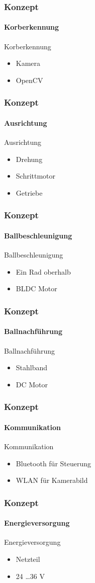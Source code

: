 \begin{frame}
    \frametitle{Konzept}
    \framesubtitle{Korberkennung}
    \begin{block}{Korberkennung}
        \begin{itemize}
            \item Kamera
            \item OpenCV
        \end{itemize}
    \end{block}
\end{frame}

\begin{frame}
    \frametitle{Konzept}
    \framesubtitle{Ausrichtung}
    \begin{block}{Ausrichtung}
        \begin{itemize}
            \item Drehung
            \item Schrittmotor
            \item Getriebe
        \end{itemize}
    \end{block}
\end{frame}

\begin{frame}
    \frametitle{Konzept}
    \framesubtitle{Ballbeschleunigung}
    \begin{block}{Ballbeschleunigung}
        \begin{itemize}
            \item Ein Rad oberhalb
            \item BLDC Motor
        \end{itemize}
    \end{block}
\end{frame}

\begin{frame}
    \frametitle{Konzept}
    \framesubtitle{Ballnachführung}
    \begin{block}{Ballnachführung}
        \begin{itemize}
            \item Stahlband
            \item DC Motor
        \end{itemize}
    \end{block}
\end{frame}

\begin{frame}
    \frametitle{Konzept}
    \framesubtitle{Kommunikation}
    \begin{block}{Kommunikation}
        \begin{itemize}
            \item Bluetooth für Steuerung
            \item WLAN für Kamerabild
        \end{itemize}
    \end{block}
\end{frame}

\begin{frame}
    \frametitle{Konzept}
    \framesubtitle{Energieversorgung}
    \begin{block}{Energieversorgung}
        \begin{itemize}
            \item Netzteil
            \item 24 \ldots 36 V
        \end{itemize}
    \end{block}
\end{frame}


